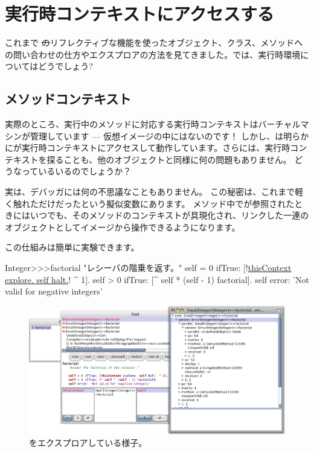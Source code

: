 \documentclass[a4paper,10pt,twoside]{book}
\begin{document}
\section{実行時コンテキストにアクセスする}

これまで \st のリフレクティブな機能を使ったオブジェクト、クラス、メソッドへの問い合わせの仕方やエクスプロアの方法を見てきました。では、実行時環境についてはどうでしょう?

\subsection{メソッドコンテキスト}

実際のところ、実行中のメソッドに対応する実行時コンテキストはバーチャルマシンが管理しています --- 仮想イメージの中にはないのです！
しかし、は明らかにが実行時コンテキストにアクセスして動作しています。さらには、実行時コンテキストを探ることも、他のオブジェクトと同様に何の問題もありません。
どうなっているいるのでしょうか？

実は、デバッガには何の不思議なこともありません。
この秘密は、これまで軽く触れただけだったという擬似変数にあります。
メソッド中でが参照されたときにはいつでも、そのメソッドのコンテキストが具現化され、リンクした一連のオブジェクトとしてイメージから操作できるようになります。

この仕組みは簡単に実験できます。


\begin{code}{}
Integer>>>factorial
	"レシーバの階乗を返す。"
	self = 0 ifTrue: [!\underline{thisContext explore. self halt.}! ^ 1].
	self > 0 ifTrue: [^ self * (self - 1) factorial].
	self error: 'Not valid for negative integers'
\end{code}


\begin{figure}[ht]\centering
	\includegraphics[width=\linewidth]{exploringThisContext}
	\caption{をエクスプロアしている様子。}
\end{figure}
\end{document}
